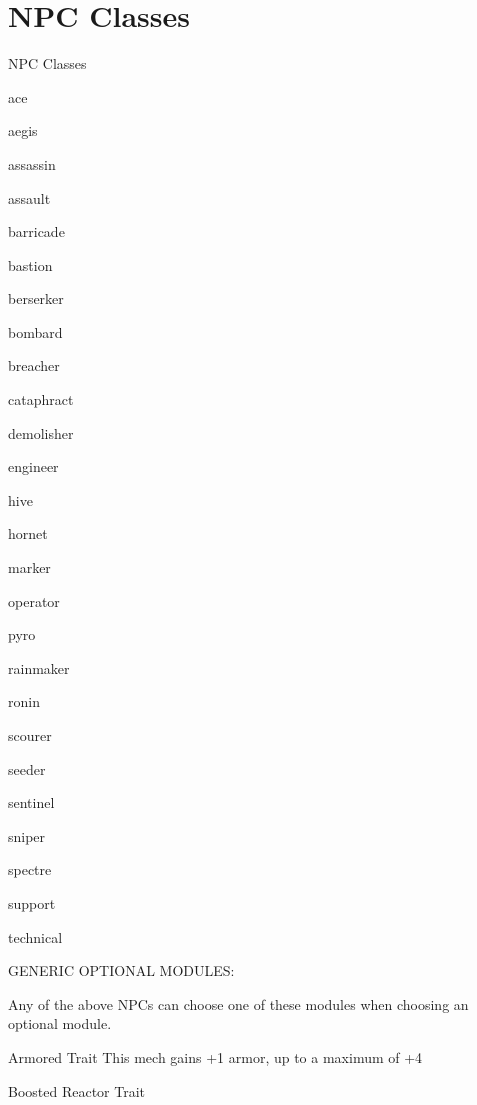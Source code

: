 \chapter{NPC Classes}

        NPC Classes

{ace}

{aegis}

{assassin}

{assault}

{barricade}

{bastion}

{berserker}

{bombard}

{breacher}

{cataphract}

{demolisher}

{engineer}

{hive}

{hornet}

{marker}

{operator}

{pyro}

{rainmaker}

{ronin}

{scourer}

{seeder}

{sentinel}

{sniper}

{spectre}

{support}

{technical}

                                     GENERIC OPTIONAL MODULES:

Any of the above NPCs can choose one of these modules when choosing an optional module.


Armored
Trait
This mech gains +1 armor, up to a maximum of +4


Boosted Reactor
Trait

